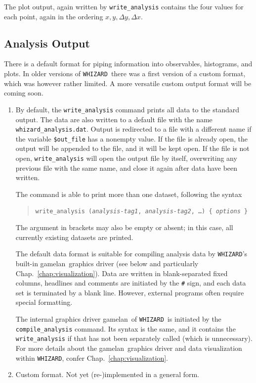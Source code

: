 \documentclass[12pt]{book}
\newcommand{\ttt}[1]{\texttt{#1}}
\newcommand{\whizard}{\ttt{WHIZARD}}
\newcommand{\gamelan}{\textsf{gamelan}}
\begin{document}
The plot output, again written by \ttt{write\_analysis} contains the four
values for each point, again in the ordering $x,y,\Delta y, \Delta x$.


\subsection{Analysis Output}

There is a default format for piping information into observables,
histograms, and plots. In older versions of \whizard\ there was a
first version of a custom format, which was however rather limited.
A more versatile custom output format will be coming soon.

\begin{enumerate}
\item
By default, the \ttt{write\_analysis} command prints all data to the
standard output. The data are also written to a default file with the
name \ttt{whizard\_analysis.dat}.
Output is redirected to a file with a different name if the
variable \ttt{\$out\_file} has a nonempty value.  If the file is
already open, the output will be appended to
the file, and it will be kept open.  If the file is not open,
\ttt{write\_analysis} will open the output file by itself, overwriting any
previous file with the same name, and close it again after data have been
written.

The command is able to print more than one dataset, following the syntax
\begin{quote}
  \begin{footnotesize}
  \ttt{write\_analysis (\emph{analysis-tag1}, \emph{analysis-tag2}, \ldots)
  \{ \emph{options} \}}
  \end{footnotesize}
\end{quote}
The argument in brackets may also be empty or absent; in this case, all
currently existing datasets are printed.

The default data format is suitable for compiling analysis data by \whizard's
built-in \gamelan\ graphics driver (see below and particularly
Chap.~\ref{chap:visualization}).  Data are written in
blank-separated fixed columns, headlines and comments are initiated by the
\verb|#| sign, and each data set is terminated by a blank line.  However,
external programs often require special formatting.

The internal graphics driver \gamelan\ of \whizard\ is initiated by
the \ttt{compile\_analysis} command. Its syntax is the same, and it
contains the \ttt{write\_analysis} if that has not been separately
called (which is unnecessary). For more details about the \gamelan\
graphics driver and data visualization within \whizard, confer
Chap.~\ref{chap:visualization}.

\item
Custom format. Not yet (re-)implemented in a general form.
\end{enumerate}
\end{document}
